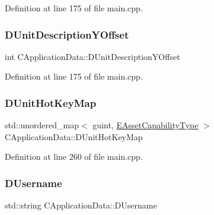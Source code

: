 Definition at line 175 of file main.\+cpp.

\hypertarget{classCApplicationData_a6c60b2da482699f1d998acfe24fec332}{}\label{classCApplicationData_a6c60b2da482699f1d998acfe24fec332} 
\subsubsection{\texorpdfstring{D\+Unit\+Description\+Y\+Offset}{DUnitDescriptionYOffset}}
{\footnotesize\ttfamily int C\+Application\+Data\+::\+D\+Unit\+Description\+Y\+Offset\hspace{0.3cm}{\ttfamily [protected]}}



Definition at line 175 of file main.\+cpp.

\hypertarget{classCApplicationData_ae0c7b5849264d7234ffb160d54650f9a}{}\label{classCApplicationData_ae0c7b5849264d7234ffb160d54650f9a} 
\subsubsection{\texorpdfstring{D\+Unit\+Hot\+Key\+Map}{DUnitHotKeyMap}}
{\footnotesize\ttfamily std\+::unordered\+\_\+map$<$ guint, \hyperlink{GameDataTypes_8h_a35b98ce26aca678b03c6f9f76e4778ce}{E\+Asset\+Capability\+Type} $>$ C\+Application\+Data\+::\+D\+Unit\+Hot\+Key\+Map\hspace{0.3cm}{\ttfamily [protected]}}



Definition at line 260 of file main.\+cpp.

\hypertarget{classCApplicationData_aedfdb512317e5b62d0bbbcddcd48dfb8}{}\label{classCApplicationData_aedfdb512317e5b62d0bbbcddcd48dfb8} 
\subsubsection{\texorpdfstring{D\+Username}{DUsername}}
{\footnotesize\ttfamily std\+::string C\+Application\+Data\+::\+D\+Username\hspace{0.3cm}{\ttfamily [protected]}}



